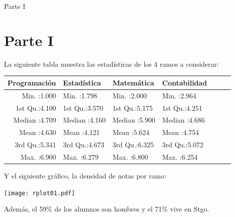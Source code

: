 \documentclass[pdf]{beamer}
\begin{document}
\begin{frame}{Parte I}
\section{Parte I}
\begin{footnotesize} 
La siguiente tabla muestra las estadísticas de los 4 ramos a considerar:

\begin{table}[ht]
\centering
\begin{tabular}{rllllll}
  \hline
  Programación & Estadística & Matemática & Contabilidad \\ 
  \hline
  Min.   :1.000   & Min.   :1.798   & Min.   :2.000   & Min.   :2.964  \\ 
  1st Qu.:4.100   & 1st Qu.:3.570   & 1st Qu.:5.175   & 1st Qu.:4.251  \\ 
  Median :4.709   & Median :4.160   & Median :5.900   & Median :4.686  \\ 
  Mean   :4.630   & Mean   :4.121   & Mean   :5.624   & Mean   :4.754  \\ 
  3rd Qu.:5.341   & 3rd Qu.:4.673   & 3rd Qu.:6.325   & 3rd Qu.:5.072  \\ 
  Max.   :6.900   & Max.   :6.279   & Max.   :6.800   & Max.   :6.254  \\ 
   \hline
\end{tabular}
\end{table}

Y el siguiente gráfico, la densidad de notas por ramo:
\begin{center}
\texttt{[image: rplot01.pdf]}
\end{center}
Además, el 59\% de los alumnos son hombres y el 71\% vive en Stgo.

\end{footnotesize}

\end{frame}
\end{document}
